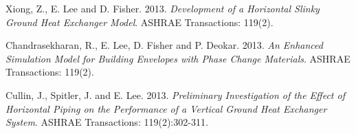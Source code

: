 \documentclass{res} %
\begin{document}
\begin{resume}
{\begin{spacing}{1.1}
Xiong, Z., E. Lee and D. Fisher. 2013. \textit{Development of a Horizontal Slinky Ground Heat Exchanger Model}. ASHRAE Transactions: 119(2).

Chandrasekharan, R., E. Lee, D. Fisher and P. Deokar. 2013. \textit{An Enhanced Simulation Model for Building Envelopes with Phase Change Materials}. ASHRAE Transactions: 119(2).

Cullin, J., Spitler, J. and E. Lee. 2013. \textit{Preliminary Investigation of the Effect of Horizontal Piping on the Performance of a Vertical Ground Heat Exchanger System}. ASHRAE Transactions: 119(2):302-311.
\end{spacing}
}

\end{resume} 
\end{document}
